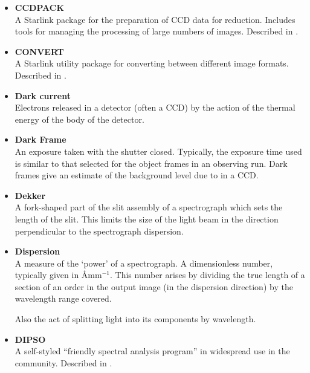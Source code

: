 \begin{itemize}
\item {\bf\label{gl_ccdpack}CCDPACK}\\
      A Starlink package for the preparation of CCD data for reduction.
      Includes tools for managing the processing of large numbers of
      images.  Described in .

\item {\bf\label{gl_convert}CONVERT}\\
      A Starlink utility package for converting between different image
      formats.  Described in .

\item {\bf\label{gl_dark_currrent}Dark current}\\
      Electrons released in a detector (often a CCD) by the action of
      the thermal energy of the body of the detector.

\item {\bf\label{gl_dark_frame}Dark Frame}\\
      An exposure taken with the shutter closed.  Typically, the
      exposure time used is similar to that selected for the object
      frames in an observing run.  Dark frames give an estimate of
      the background level due to 
      in a CCD.

\item {\bf\label{gl_dekker}Dekker}\\
      A fork-shaped part of the slit assembly of a spectrograph which
      sets the length of the slit.  This limits the size of the light
      beam in the direction perpendicular to the spectrograph dispersion.

\item {\bf\label{gl_dispersion}Dispersion}\\
      A measure of the `power' of a spectrograph. A dimensionless number,
      typically given in \AA mm${}^{-1}$.  This number arises by dividing
      the true
      length of a section of an order in the output image (in the
      dispersion direction) by the wavelength range covered.

      Also the act of splitting light into its components by wavelength.

\item {\bf\label{gl_dipso}DIPSO}\\
      A self-styled ``friendly spectral analysis program'' in
      widespread use in the community.  Described in
      .


\end{itemize}
